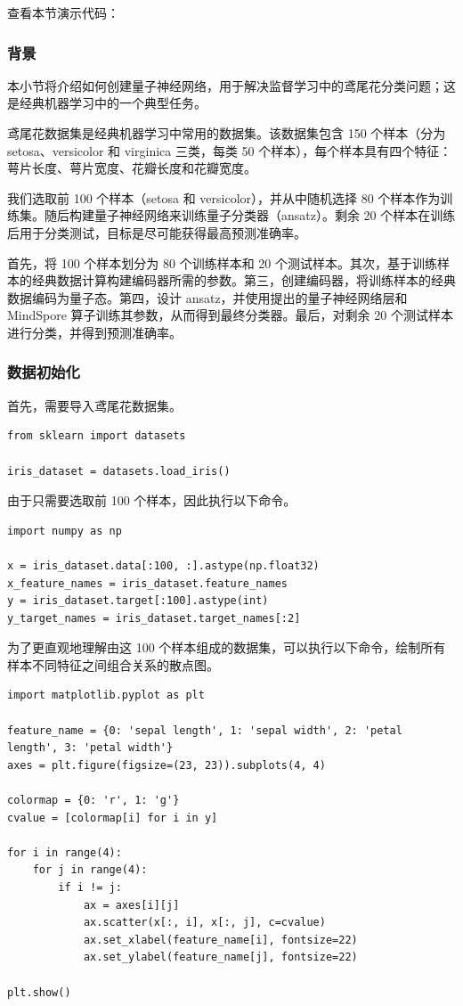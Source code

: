 查看本节演示代码： \ 
\subsubsection{背景}
本小节将介绍如何创建量子神经网络，用于解决监督学习中的鸢尾花分类问题；这是经典机器学习中的一个典型任务。

鸢尾花数据集是经典机器学习中常用的数据集。该数据集包含 150 个样本（分为 setosa、versicolor 和 virginica 三类，每类 50 个样本），每个样本具有四个特征：萼片长度、萼片宽度、花瓣长度和花瓣宽度。

我们选取前 100 个样本（setosa 和 versicolor），并从中随机选择 80 个样本作为训练集。随后构建量子神经网络来训练量子分类器（ansatz）。剩余 20 个样本在训练后用于分类测试，目标是尽可能获得最高预测准确率。

首先，将 100 个样本划分为 80 个训练样本和 20 个测试样本。其次，基于训练样本的经典数据计算构建编码器所需的参数。第三，创建编码器，将训练样本的经典数据编码为量子态。第四，设计 ansatz，并使用提出的量子神经网络层和 MindSpore 算子训练其参数，从而得到最终分类器。最后，对剩余 20 个测试样本进行分类，并得到预测准确率。

\subsubsection{数据初始化}
首先，需要导入鸢尾花数据集。

\begin{lstlisting}
from sklearn import datasets

iris_dataset = datasets.load_iris()
\end{lstlisting}

由于只需要选取前 100 个样本，因此执行以下命令。

\begin{lstlisting}
import numpy as np

x = iris_dataset.data[:100, :].astype(np.float32)
x_feature_names = iris_dataset.feature_names
y = iris_dataset.target[:100].astype(int)
y_target_names = iris_dataset.target_names[:2]
\end{lstlisting}

为了更直观地理解由这 100 个样本组成的数据集，可以执行以下命令，绘制所有样本不同特征之间组合关系的散点图。

\begin{lstlisting}
import matplotlib.pyplot as plt

feature_name = {0: 'sepal length', 1: 'sepal width', 2: 'petal length', 3: 'petal width'}
axes = plt.figure(figsize=(23, 23)).subplots(4, 4)

colormap = {0: 'r', 1: 'g'}
cvalue = [colormap[i] for i in y]

for i in range(4):
    for j in range(4):
        if i != j:
            ax = axes[i][j]
            ax.scatter(x[:, i], x[:, j], c=cvalue)
            ax.set_xlabel(feature_name[i], fontsize=22)
            ax.set_ylabel(feature_name[j], fontsize=22)

plt.show()
\end{lstlisting}

